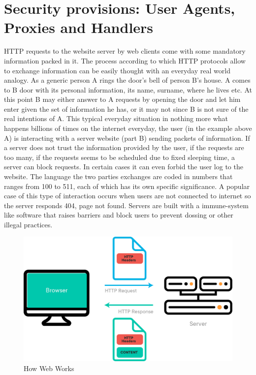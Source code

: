 \documentclass[
  12pt,
  a4paper,
  oneside]{book}
\theoremstyle{definition}
\theoremstyle{definition}
\theoremstyle{definition}
\theoremstyle{remark}
\begin{document}
\hypertarget{security-provisions-user-agents-proxies-and-handlers}{%
\section{Security provisions: User Agents, Proxies and Handlers}\label{security-provisions-user-agents-proxies-and-handlers}}

HTTP requests to the website server by web clients come with some mandatory information packed in it. The process according to which HTTP protocols allow to exchange information can be easily thought with an everyday real world analogy. As a generic person A rings the door's bell of person B's house. A comes to B door with its personal information, its name, surname, where he lives etc. At this point B may either answer to A requests by opening the door and let him enter given the set of information he has, or it may not since B is not sure of the real intentions of A. This typical everyday situation in nothing more what happens billions of times on the internet everyday, the user (in the example above A) is interacting with a server website (part B) sending packets of information. If a server does not trust the information provided by the user, if the requests are too many, if the requests seems to be scheduled due to fixed sleeping time, a server can block requests. In certain cases it can even forbid the user log to the website. The language the two parties exchanges are coded in numbers that ranges from 100 to 511, each of which has its own specific significance. A popular case of this type of interaction occurs when users are not connected to internet so the server responds 404, page not found. Servers are built with a immune-system like software that raises barriers and block users to prevent dossing or other illegal practices.

\begin{figure}
\centering
\includegraphics{images/how_web_works.png}
\caption{How Web Works}
\end{figure}
\end{document}
